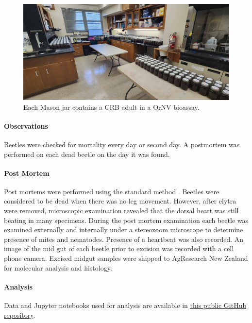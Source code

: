 \documentclass[12pt,letterpaper,english,bibliography=totocnumbered, abstract=on]{scrartcl}
\begin{document}
\begin{figure}[H]
	\centering
	\includegraphics[width=0.7\linewidth]{images/lab}
	\caption{Each Mason jar contains a CRB adult in a OrNV bioassay.}
	\label{fig:lab}
\end{figure}
 


\paragraph{Observations}

Beetles were checked for mortality every day or second day. A postmortem was performed on each dead beetle on the day it was found.

\paragraph{Post Mortem}

Post mortems were performed using the standard method \cite{AgResearch2023-OrNV-minitest}. Beetles were considered to be dead when there was no leg movement. However, after elytra were removed, microscopic examination revealed that the dorsal heart was still beating in many specimens. During the post mortem examination each beetle was examined externally and internally under a stereozoom microscope to determine presence of mites and nematodes. Presence of a heartbeat was also recorded. An image of the mid gut of each beetle prior to excision was recorded with a cell phone camera. 
Excised midgut samples were shipped to AgResearch New Zealand for molecular analysis and histology.

\paragraph{Analysis}

Data and Jupyter notebooks used for analysis are available in \href{https://github.com/aubreymoore/ornv-bioassay-db}{this public GitHub repository}. 

\clearpage
\end{document}
